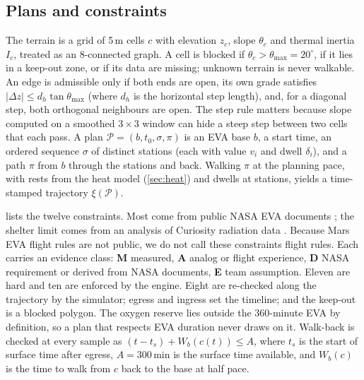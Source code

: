 \subsection{Plans and constraints}
The terrain is a grid of 5\,m cells $c$ with elevation $z_c$, slope $\theta_c$ and thermal inertia $I_c$, treated as an 8-connected graph. A cell is blocked if $\theta_c>\theta_{\max}=20^\circ$, if it lies in a keep-out zone, or if its data are missing; unknown terrain is never walkable. An edge is admissible only if both ends are open, its own grade satisfies $|\Delta z|\le d_h\tan\theta_{\max}$ (where $d_h$ is the horizontal step length), and, for a diagonal step, both orthogonal neighbours are open. The step rule matters because slope computed on a smoothed $3\times3$ window can hide a steep step between two cells that each pass. A plan $\mathcal{P}=(b,t_0,\sigma,\pi)$ is an EVA base $b$, a start time, an ordered sequence $\sigma$ of distinct stations (each with value $v_i$ and dwell $\delta_i$), and a path $\pi$ from $b$ through the stations and back. Walking $\pi$ at the planning pace, with rests from the heat model (\cref{sec:heat}) and dwells at stations, yields a time-stamped trajectory $\xi(\mathcal{P})$.

 lists the twelve constraints. Most come from public NASA EVA documents \citep{coan2020conops,kagey2023tenets,caswell2025eva,ogilvie2026marsmass,bussey2016landing}; the shelter limit comes from an analysis of Curiosity radiation data \citep{lowe2025nowcast}. Because Mars EVA flight rules are not public, we do not call these constraints flight rules. Each carries an evidence class: \textbf{M} measured, \textbf{A} analog or flight experience, \textbf{D} NASA requirement or derived from NASA documents, \textbf{E} team assumption. Eleven are hard and ten are enforced by the engine. Eight are re-checked along the trajectory by the simulator; egress and ingress set the timeline; and the keep-out is a blocked polygon. The oxygen reserve lies outside the 360-minute EVA by definition, so a plan that respects EVA duration never draws on it. Walk-back is checked at every sample as $(t-t_s)+W_b(c(t))\le A$, where $t_s$ is the start of surface time after egress, $A=300$\,min is the surface time available, and $W_b(c)$ is the time to walk from $c$ back to the base at half pace.

